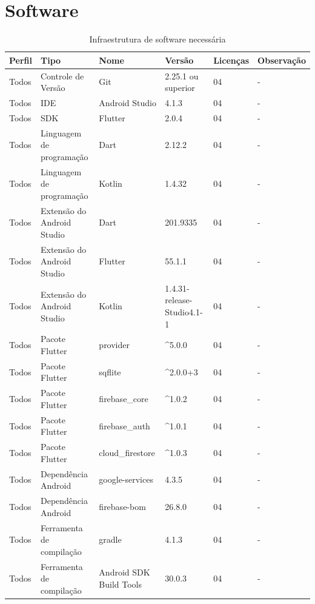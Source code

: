 \documentclass[
	12pt,				%
	oneside,			%
	a4paper,			%
	english,			%
	brazil,				%
	]{abntex2}
\begin{document}
\section{Software}
\begin{table}[ht]
\caption{Infraestrutura de software necessária}%
\label{tab:ambiente_software}
\centering
\IBGEtabfontsize
\begin{tabular}{@{}p{}p{}p{}p{}p{}p{}@{}}
\toprule
\textbf{Perfil} & \textbf{Tipo} & \textbf{Nome} & \textbf{Versão} & \textbf{Licenças}  & \textbf{Observação} \\ \midrule
Todos & Controle de Versão & Git & 2.25.1 ou superior & 04  & - \\ \midrule
Todos & IDE & Android Studio & 4.1.3 & 04  & - \\ \midrule
Todos & SDK & Flutter & 2.0.4 & 04  & - \\ \midrule
Todos & Linguagem de programação & Dart & 2.12.2 & 04  & - \\ \midrule
Todos & Linguagem de programação & Kotlin & 1.4.32 & 04  & - \\ \midrule
Todos & Extensão do Android Studio & Dart & 201.9335 & 04  & - \\ \midrule
Todos & Extensão do Android Studio & Flutter & 55.1.1 & 04  & - \\ \midrule
Todos & Extensão do Android Studio & Kotlin & 1.4.31-release-Studio4.1-1 & 04  & - \\ \midrule
Todos & Pacote Flutter & provider & \^{}5.0.0 & 04 & - \\ \midrule
Todos & Pacote Flutter & sqflite & \^{}2.0.0+3 & 04 & - \\ \midrule
Todos & Pacote Flutter & firebase\_core & \^{}1.0.2 & 04 & - \\ \midrule
Todos & Pacote Flutter & firebase\_auth & \^{}1.0.1 & 04  & - \\ \midrule
Todos & Pacote Flutter & cloud\_firestore & \^{}1.0.3 & 04  & - \\ \midrule
Todos & Dependência Android & google-services & 4.3.5 & 04  & - \\ \midrule
Todos & Dependência Android & firebase-bom & 26.8.0 & 04  & - \\ \midrule
Todos & Ferramenta de compilação & gradle & 4.1.3 & 04  & - \\ \midrule
Todos & Ferramenta de compilação & Android SDK Build Tools & 30.0.3 & 04  & - \\ \bottomrule
\end{tabular}%
\end{table}
\end{document}
